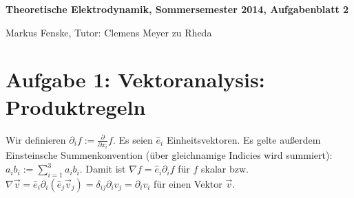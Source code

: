 \documentclass[a4paper,german,12pt,smallheadings]{scrartcl}
\begin{document}
\allowdisplaybreaks %
\begin{center}
\bfseries %
\sffamily %
\vspace{-40pt}
Theoretische Elektrodynamik, Sommersemester 2014, Aufgabenblatt 2

Markus Fenske, Tutor: Clemens Meyer zu Rheda
\vspace{-10pt}
\end{center}

\section*{Aufgabe 1: Vektoranalysis: Produktregeln}

Wir definieren $\partial_i f := \frac{\partial}{\partial x_i} f$.
Es seien $\hat{e}_i$ Einheitsvektoren.
Es gelte außerdem Einsteinsche Summenkonvention (über gleichnamige Indicies
wird summiert): $a_ib_i := \sum_{i=1}^3 a_ib_i$.
Damit ist $\nabla f = \hat{e}_i \partial_i f$ für $f$ skalar bzw. $\nabla
\vec{v} = \hat{e}_i \partial_i (\hat{e}_j \vec{v}_j) = \delta_{ij} \partial_i
v_j = \partial_i v_i$ für einen Vektor $\vec{v}$.
\end{document}
